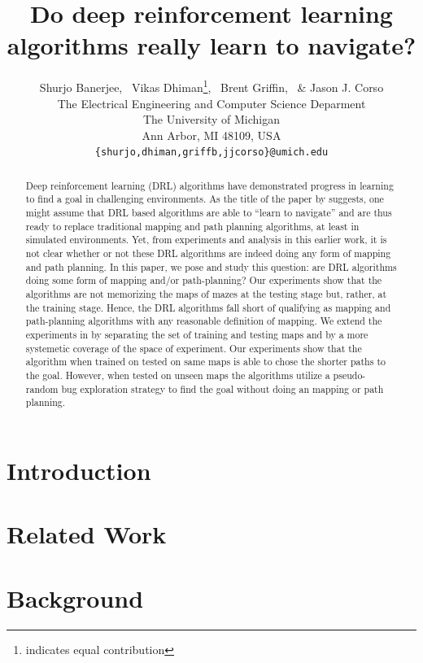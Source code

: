 \documentclass{article} %
\title{Do deep reinforcement learning algorithms really learn to navigate?}
\author{Shurjo Banerjee\footnotemark[1],%
  \, Vikas Dhiman\thanks{indicates equal contribution},%
  \, Brent Griffin,%
  \, \& Jason J. Corso\\
  The Electrical Engineering and Computer Science Deparment\\
The University of Michigan\\
Ann Arbor, MI 48109, USA \\
\texttt{\{shurjo,dhiman,griffb,jjcorso\}@umich.edu} \\
}
\begin{document}
\maketitle
\begin{abstract}
  Deep reinforcement learning (DRL) algorithms have demonstrated progress in learning to find a goal in challenging environments.
  As the title of the paper by \cite{MiPaViICLR2017} suggests, one might assume that DRL based algorithms are able to ``learn to navigate'' and are thus ready to replace traditional mapping and path planning algorithms, at least in simulated environments.
  Yet, from experiments and analysis in this earlier work, it is not clear whether or not these DRL algorithms are indeed doing any form of mapping and path planning.
  In this paper, we pose and study this question: are DRL algorithms doing some form of mapping and/or path-planning?  Our experiments show that the algorithms are not memorizing the maps of mazes at the testing stage but, rather, at the training stage.
  Hence, the DRL algorithms fall short of qualifying as mapping and path-planning algorithms with any reasonable definition of mapping.
  We extend the experiments in \cite{MiPaViICLR2017} by separating the set of training and testing maps and by a more systemetic coverage of the space of experiment.
  Our experiments show that the \NavAiiiCDiDiiL{} algorithm when trained on tested on same maps is able to chose the shorter paths to the goal.
  However, when tested on unseen maps the algorithms utilize a pseudo-random bug exploration strategy to find the goal without doing an mapping or path planning.
\end{abstract}

\section{Introduction}
%


\section{Related Work}


\section{Background}


%
\end{document}
